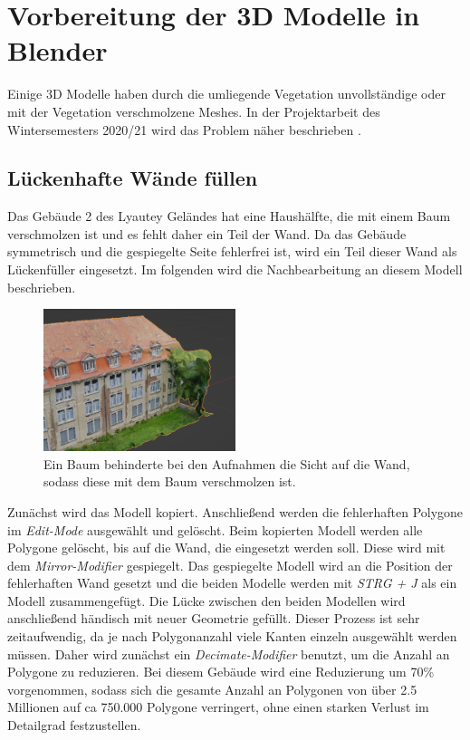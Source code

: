 \section{Vorbereitung der 3D Modelle in Blender}
Einige 3D Modelle haben durch die umliegende Vegetation unvollständige oder mit der Vegetation verschmolzene Meshes. In der Projektarbeit des Wintersemesters 2020/21 wird das Problem näher beschrieben \cite*{kusch2021}.

\subsection{Lückenhafte Wände füllen}
Das Gebäude 2 des Lyautey Geländes hat eine Haushälfte, die mit einem Baum verschmolzen ist und es fehlt daher ein Teil der Wand. Da das Gebäude symmetrisch und die gespiegelte Seite fehlerfrei ist, wird ein Teil dieser Wand als Lückenfüller eingesetzt. Im folgenden wird die Nachbearbeitung an diesem Modell beschrieben.

\begin{figure}[ht]
    \centering
    \includegraphics[width=0.5\textwidth]{img/vorbereitungen_blender_modelle/g2_verschmolzen.jpg}
    \caption{Ein Baum behinderte bei den Aufnahmen die Sicht auf die Wand, sodass diese mit dem Baum verschmolzen ist.}
    \label{fig:g2_verschmolzen}
\end{figure}

Zunächst wird das Modell kopiert. Anschließend werden die fehlerhaften Polygone im \textit{Edit-Mode} ausgewählt und gelöscht. Beim kopierten Modell werden alle Polygone gelöscht, bis auf die Wand, die eingesetzt werden soll. Diese wird mit dem \textit{Mirror-Modifier} gespiegelt. Das gespiegelte Modell wird an die Position der fehlerhaften Wand gesetzt und die beiden Modelle werden mit \textit{STRG + J} als ein Modell zusammengefügt. Die Lücke zwischen den beiden Modellen wird anschließend händisch mit neuer Geometrie gefüllt. Dieser Prozess ist sehr zeitaufwendig, da je nach Polygonanzahl viele Kanten einzeln ausgewählt werden müssen. Daher wird zunächst ein \textit{Decimate-Modifier} benutzt, um die Anzahl an Polygone zu reduzieren. Bei diesem Gebäude wird eine Reduzierung um 70\% vorgenommen, sodass sich die gesamte Anzahl an Polygonen von über 2.5 Millionen auf ca 750.000 Polygone verringert, ohne einen starken Verlust im Detailgrad festzustellen.

